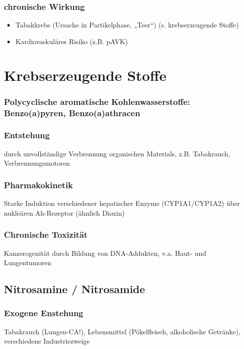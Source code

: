 \documentclass[10pt,a4paper]{report}
\begin{document}
\subsubsection{chronische Wirkung} %
\label{ssub:chronische_wirkung}
\begin{itemize}
	\item Tabakkrebs (Ursache in Partikelphase, „Teer“) (s. krebserzeugende Stoffe)
	\item Kardiovaskuläres Risiko (z.B. pAVK)
\end{itemize}
\section{Krebserzeugende Stoffe} %
\label{sec:krebserzeugende_stoffe}
\subsubsection{Polycyclische aromatische Kohlenwasserstoffe: Benzo(a)pyren, Benzo(a)athracen} %
\label{ssub:polycyclische_aromatische_kohlenwasserstoffe_benzo}
\subsubsection{Entstehung} %
\label{ssub:entstehung}
durch unvollständige Verbrennung organischen Materials, z.B. Tabakrauch, Verbrennungsmotoren
\subsubsection{Pharmakokinetik} %
\label{ssub:pharmakokinetik}
Starke Induktion verschiedener hepatischer Enzyme (CYP1A1/CYP1A2) über nukleären Ah-Rezeptor (ähnlich Dioxin)
\subsubsection{Chronische Toxizität} %
\label{ssub:chronische_toxizit_t}
Kanzerogenität durch Bildung von DNA-Addukten, v.a. Haut- und Lungentumoren
\subsection{Nitrosamine / Nitrosamide} %
\label{sub:nitrosamine_nitrosamide}
\subsubsection{Exogene Enstehung} %
\label{ssub:subsubsection_name}
Tabakrauch (Lungen-CA!), Lebensmittel (Pökelfleisch, alkoholische Getränke), verschiedene Industriezweige 
\end{document}
